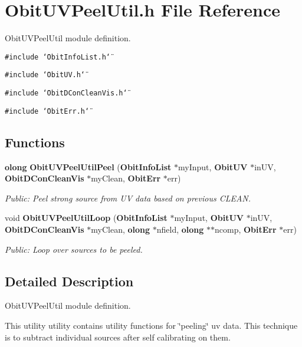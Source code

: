 \section{Obit\-UVPeel\-Util.h File Reference}
\label{ObitUVPeelUtil_8h}
Obit\-UVPeel\-Util module definition. 

{\tt \#include \char`\"{}Obit\-Info\-List.h\char`\"{}}\par
{\tt \#include \char`\"{}Obit\-UV.h\char`\"{}}\par
{\tt \#include \char`\"{}Obit\-DCon\-Clean\-Vis.h\char`\"{}}\par
{\tt \#include \char`\"{}Obit\-Err.h\char`\"{}}\par
\subsection*{Functions}
\begin{CompactItemize}
\item 
{\bf olong} {\bf Obit\-UVPeel\-Util\-Peel} ({\bf Obit\-Info\-List} $\ast$my\-Input, {\bf Obit\-UV} $\ast$in\-UV, {\bf Obit\-DCon\-Clean\-Vis} $\ast$my\-Clean, {\bf Obit\-Err} $\ast$err)
\begin{CompactList}\small\item\em Public: Peel strong source from UV data based on previous CLEAN. \item\end{CompactList}\item 
void {\bf Obit\-UVPeel\-Util\-Loop} ({\bf Obit\-Info\-List} $\ast$my\-Input, {\bf Obit\-UV} $\ast$in\-UV, {\bf Obit\-DCon\-Clean\-Vis} $\ast$my\-Clean, {\bf olong} $\ast$nfield, {\bf olong} $\ast$$\ast$ncomp, {\bf Obit\-Err} $\ast$err)
\begin{CompactList}\small\item\em Public: Loop over sources to be peeled. \item\end{CompactList}\end{CompactItemize}


\subsection{Detailed Description}
Obit\-UVPeel\-Util module definition. 

This utility utility contains utility functions for \char`\"{}peeling\char`\"{} uv data. This technique is to subtract individual sources after self calibrating on them.

